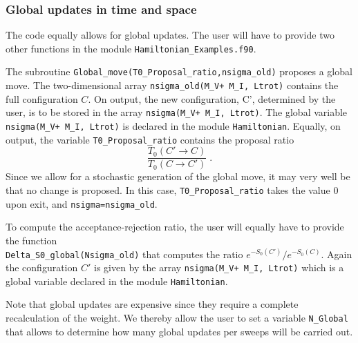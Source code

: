 \subsubsection{Global updates in time and space}
%  
The code equally allows for global updates.  The user will have to provide two other functions in the module \texttt{Hamiltonian\_Examples.f90}.   

The subroutine  \texttt{Global\_move(T0\_Proposal\_ratio,nsigma\_old)}  proposes  a global move. 
The two-dimensional array \texttt{nsigma\_old(M\_V+ M\_I, Ltrot)}  contains  the full  configuration $C$.  On output, the new configuration,   C', determined by the user,  is to be stored in the 
array  \texttt{nsigma(M\_V+ M\_I, Ltrot)}.   The global variable \texttt{nsigma(M\_V+ M\_I, Ltrot)} is declared in the module \texttt{Hamiltonian}.  Equally, on output, the variable 
\texttt{T0\_Proposal\_ratio} contains the proposal ratio 
\begin{equation}
	 \frac{T_0(C' \rightarrow C)}{T_0(C \rightarrow C') }  \;.
\end{equation}
Since we allow for a stochastic  generation of  the global move, it may very well be that no change is proposed. In this case, \texttt{T0\_Proposal\_ratio}   takes the value 0 upon exit, and  
\texttt{nsigma=nsigma\_old}.   

To compute the acceptance-rejection ratio,  the user  will equally have to provide the function \\
\texttt{Delta\_S0\_global(Nsigma\_old)} that computes the ratio $e^{-S_0(C')}/e^{-S_0(C)}$. Again the configuration $C'$ is   given by the array \texttt{nsigma(M\_V+ M\_I, Ltrot)}  which is 
a global variable declared in the module \texttt{Hamiltonian}.

Note that global updates are expensive since they require a complete recalculation of the weight. We thereby  allow the user to set a variable \texttt{N\_Global} that allows to  determine how many global updates per sweeps will be carried out. 
% 

